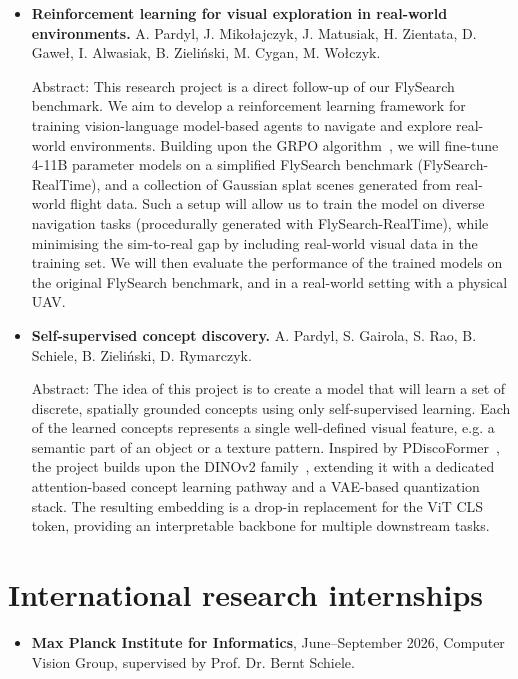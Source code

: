 \begin{itemize}
    \item \textbf{Reinforcement learning for visual exploration in real-world environments.} A. Pardyl, J. Mikołajczyk, J. Matusiak, H. Zientata, D. Gaweł, I. Alwasiak, B. Zieliński, M. Cygan, M. Wołczyk.
    
    Abstract: This research project is a direct follow-up of our FlySearch~\cite{pardyl2025flysearch} benchmark.
    We aim to develop a reinforcement learning framework for training vision-language model-based agents to navigate and explore real-world environments.
    Building upon the GRPO algorithm~\cite{shao2024deepseekmath}, we will fine-tune 4-11B parameter models on a simplified FlySearch benchmark (FlySearch-RealTime), and a collection of Gaussian splat scenes generated from real-world flight data. Such a setup will allow us to
    train the model on diverse navigation tasks (procedurally generated with FlySearch-RealTime), while minimising the sim-to-real gap by including real-world visual data in the training set. We will then evaluate the performance of the trained models on the original FlySearch benchmark, and in a real-world setting with a physical UAV.

    \item \textbf{Self-supervised concept discovery.} A. Pardyl, S. Gairola, S. Rao, B. Schiele, B. Zieliński, D. Rymarczyk.
    
    Abstract: The idea of this project is to create a model that will learn a set of discrete, spatially grounded concepts using only self-supervised learning. Each of the learned concepts represents a single well-defined visual feature, e.g. a semantic part of an object or a texture pattern. Inspired by PDiscoFormer~\cite{aniraj2024pdiscoformer}, the project builds upon the DINOv2 family~\cite{oquab2024dinov2}, extending it with a dedicated attention-based concept learning pathway and a VAE-based quantization stack. The resulting embedding is a drop-in replacement for the ViT CLS token, providing an interpretable backbone for multiple downstream tasks.
    
\end{itemize}

\section{International research internships}
\begin{itemize}
    \item \textbf{Max Planck Institute for Informatics}, June--September 2026, Computer Vision Group, supervised by Prof. Dr. Bernt Schiele.
\end{itemize}

